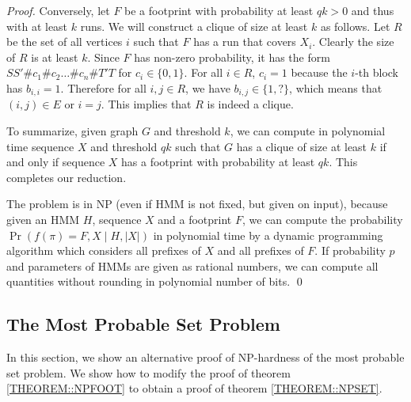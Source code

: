 \begin{proof}
Conversely, let $F$ be a footprint with probability at least $qk>0$
and thus with at least $k$ runs. We will construct a clique of size at
least $k$ as follows. Let $R$ be the set of all vertices $i$ such that
$F$ has a run that covers $X_i$. Clearly the size of $R$ is at least
$k$.  Since $F$ has non-zero probability, it has the form
$SS'\#c_1\#c_2\dots\#c_n\#T'T$ for $c_i\in \{0,1\}$. For all $i\in R$,
$c_i=1$ because the $i$-th block has $b_{i,i}=1$. Therefore for all
$i,j\in R$, we have $b_{i,j}\in \{1,?\}$, which means that $(i,j)\in
E$ or $i=j$. This implies that $R$ is indeed a clique.

To summarize, given graph $G$ and threshold $k$, we can compute in
polynomial time sequence $X$ and threshold $qk$ such that $G$ has a
clique of size at least $k$ if and only if sequence $X$ has a
footprint with probability at least $qk$. This completes our reduction.

The problem is in NP (even if HMM is not fixed, but given on input),
because given an HMM $H$, sequence $X$ and a footprint $F$, we can
compute the probability $\Pr(f(\pi)=F,X\mid H,|X|)$ in polynomial time
by a dynamic programming algorithm which considers all prefixes of
$X$ and all prefixes of $F$. If probability $p$ and parameters of HMMs
are given as rational numbers, we can compute all quantities without
rounding in polynomial number of bits. \qed
\end{proof}

\subsection{The Most Probable Set Problem}
In this section, we show an alternative proof of NP-hardness of the most
probable set problem. We show how to modify the proof of theorem \ref{THEOREM::NPFOOT}
to obtain a proof of theorem \ref{THEOREM::NPSET}.


